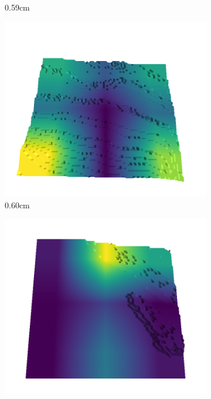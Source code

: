 \begin{figure}[H]
\begin{subfigure}[b]{0.192\linewidth}
    \caption{0.59cm}
    \label{fig : quarry-best-12}
    \end{subfigure}
    \begin{subfigure}[b]{0.192\linewidth}
    \includegraphics[width=\linewidth]{../img/5/quarry/best/60-patch-3d-majavi-colormap-130.png}
    \caption{0.60cm}
    \label{fig : quarry-best-13}
    \end{subfigure}
    \begin{subfigure}[b]{0.192\linewidth}
    \includegraphics[width=\linewidth]{../img/5/quarry/best/62-patch-3d-majavi-colormap-140.png}

\end{subfigure}
\end{figure}
